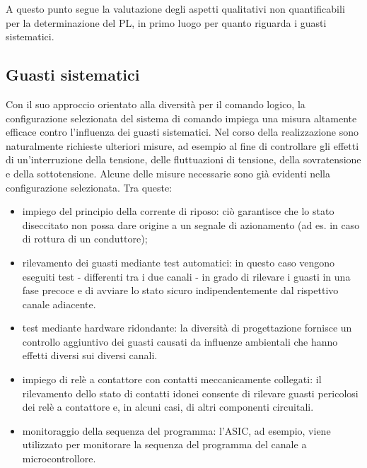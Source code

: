A questo punto segue la valutazione degli aspetti qualitativi non quantificabili per la determinazione del PL, in primo luogo per quanto riguarda i guasti sistematici.

\subsection{Guasti sistematici}
\label{subsec:06-5-7}
Con il suo approccio orientato alla diversità per il comando logico, la configurazione selezionata del sistema di comando impiega una misura altamente efficace contro l'influenza dei guasti sistematici. Nel corso della realizzazione sono naturalmente richieste ulteriori misure, ad esempio al fine di controllare gli effetti di un'interruzione della tensione, delle fluttuazioni di tensione, della sovratensione e della sottotensione. Alcune delle misure necessarie sono già evidenti nella configurazione selezionata. Tra queste:
\begin{itemize}
    \item impiego del principio della corrente di riposo: ciò garantisce che lo stato diseccitato non possa dare origine a un segnale di azionamento (ad es. in caso di rottura di un conduttore);
    \item rilevamento dei guasti mediante test automatici: in questo caso vengono eseguiti test - differenti tra i due canali - in grado di rilevare i guasti in una fase precoce e di avviare lo stato sicuro indipendentemente dal rispettivo canale adiacente.
    \item test mediante hardware ridondante: la diversità di progettazione fornisce un controllo aggiuntivo dei guasti causati da influenze ambientali che hanno effetti diversi sui diversi canali.
    \item impiego di relè a contattore con contatti meccanicamente collegati: il rilevamento dello stato di contatti idonei consente di rilevare guasti pericolosi dei relè a contattore e, in alcuni casi, di altri componenti circuitali.
    \item monitoraggio della sequenza del programma: l'ASIC, ad esempio, viene utilizzato per monitorare la sequenza del programma del canale a microcontrollore.
\end{itemize}

